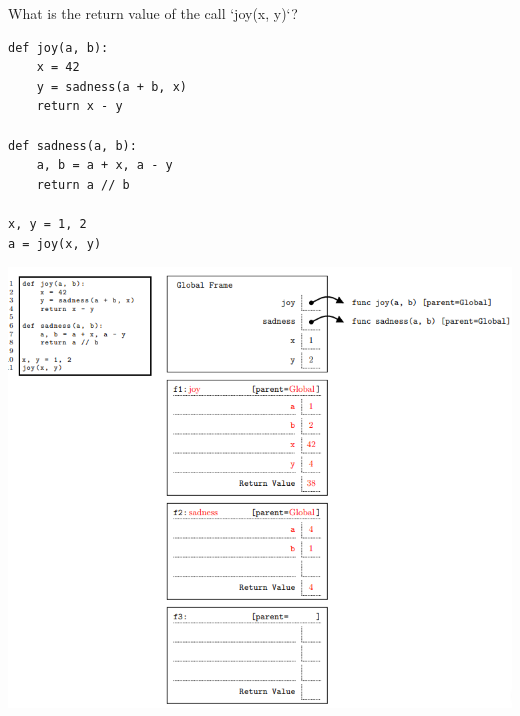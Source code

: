 \begin{blocksection}
\question What is the return value of the call `joy(x, y)`? 

\begin{lstlisting}
def joy(a, b):
    x = 42
    y = sadness(a + b, x)
    return x - y

def sadness(a, b):
    a, b = a + x, a - y
    return a // b

x, y = 1, 2
a = joy(x, y)
\end{lstlisting}

\begin{solution}[2in]
\includegraphics[width=\linewidth]{joy.png}
\end{solution}
\end{blocksection}
